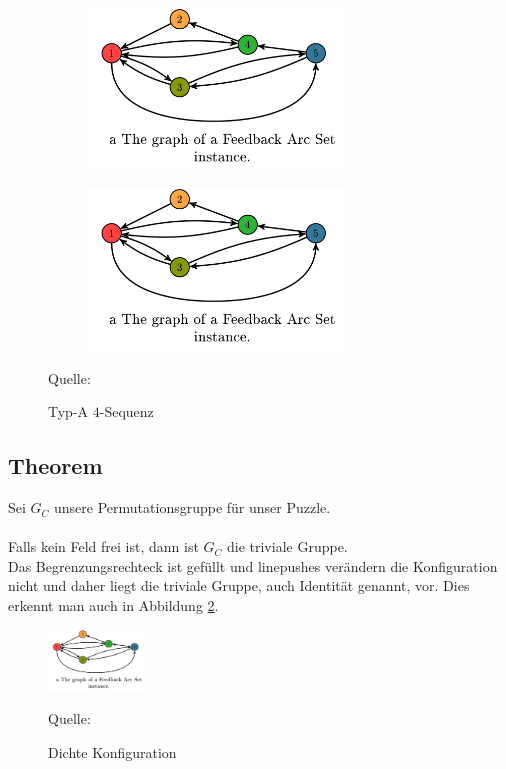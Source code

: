 \documentclass[seminar,german]{algothesis}
\newcommand*{\quelle}{%
  \footnotesize Quelle:
}
\begin{document}
\begin{figure}[ht]
	\centering
	\begin{subfigure}{.25\textwidth}
		\includegraphics[width=0.75\textwidth]{graph}
    \end{subfigure}%
    \begin{subfigure}{.25\textwidth}
		\includegraphics[width=0.75\textwidth]{graph}
    \end{subfigure}
    \caption{Typ-A $4$-Sequenz}
    \quelle \cite{akitaya2022pushing}
	\label{fig:17}
\end{figure}
\newpage
\subsection{Theorem}
Sei $G_C$ unsere Permutationsgruppe für unser Puzzle.\\\\
Falls kein Feld frei ist, dann ist $G_C$ die triviale Gruppe.\\
Das Begrenzungsrechteck ist gefüllt und linepushes verändern die Konfiguration nicht und daher liegt die triviale Gruppe, auch Identität genannt, vor. Dies erkennt man auch in Abbildung \ref{fig:15}.

\begin{figure}[ht]
	\centering
	\includegraphics[width=0.23\textwidth]{graph}
	\caption{Dichte Konfiguration}
	\quelle\cite{akitaya2022pushing}
	\label{fig:15}
\end{figure}
\end{document}
